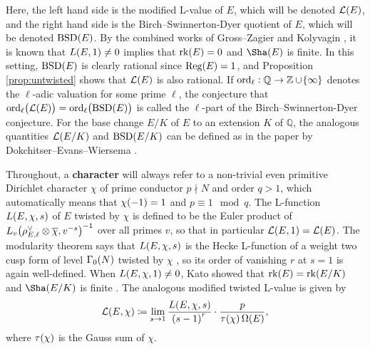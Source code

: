 \documentclass{article}
\theoremstyle{plain}
\theoremstyle{definition}
\newcommand{\BSD}{\operatorname{BSD}}
\newcommand{\LLL}{\mathcal{L}}
\newcommand{\ord}{\operatorname{ord}}
\newcommand{\QQ}{\mathbb{Q}}
\newcommand{\Reg}{\operatorname{Reg}}
\newcommand{\rk}{\operatorname{rk}}
\newcommand{\ZZ}{\mathbb{Z}}
\newcommand{\br}{\!\del}
\begin{document}
Here, the left hand side is the modified L-value of $ E $, which will be denoted $ \LLL\br{E} $, and the right hand side is the Birch--Swinnerton-Dyer quotient of $ E $, which will be denoted $ \BSD\br{E} $. By the combined works of Gross--Zagier \cite[Theorem 7.3]{GZ86} and Kolyvagin \cite[Corollary 2]{Kol88}, it is known that $ L\br{E, 1} \ne 0 $ implies that $ \rk\br{E} = 0 $ and $ \Sha\br{E} $ is finite. In this setting, $ \BSD\br{E} $ is clearly rational since $ \Reg\br{E} = 1 $, and Proposition \ref{prop:untwisted} shows that $ \LLL\br{E} $ is also rational. If $ \ord_\ell : \QQ \to \ZZ \cup \cbr{\infty} $ denotes the $ \ell $-adic valuation for some prime $ \ell $, the conjecture that $ \ord_\ell\br{\LLL\br{E}} = \ord_\ell\br{\BSD\br{E}} $ is called the $ \ell $-part of the Birch--Swinnerton-Dyer conjecture. For the base change $ E / K $ of $ E $ to an extension $ K $ of $ \QQ $, the analogous quantities $ \LLL\br[0]{E / K} $ and $ \BSD\br[0]{E / K} $ can be defined as in the paper by Dokchitser--Evans--Wiersema \cite[Section 1.5]{DEW21}.

Throughout, a \textbf{character} will always refer to a non-trivial even primitive Dirichlet character $ \chi $ of prime conductor $ p \nmid N $ and order $ q > 1 $, which automatically means that $ \chi\br{-1} = 1 $ and $ p \equiv 1 \mod q $. The L-function $ L\br{E, \chi, s} $ of $ E $ twisted by $ \chi $ is defined to be the Euler product of $ L_v\br[1]{\rho_{E, \ell}^\vee \otimes \overline{\chi}, v^{-s}}^{-1} $ over all primes $ v $, so that in particular $ \LLL\br{E, 1} = \LLL\br{E} $. The modularity theorem says that $ L\br{E, \chi, s} $ is the Hecke L-function of a weight two cusp form of level $ \Gamma_0\br{N} $ twisted by $ \chi $ \cite[Theorem 3.66]{Shi71}, so its order of vanishing $ r $ at $ s = 1 $ is again well-defined. When $ L\br{E, \chi, 1} \ne 0 $, Kato showed that $ \rk\br{E} = \rk\br[0]{E / K} $ and $ \Sha\br[0]{E / K} $ is finite \cite[Corollary 14.3]{Ka04}. The analogous modified twisted L-value is given by
$$ \LLL\br{E, \chi} \coloneqq \lim_{s \to 1} \dfrac{L\br{E, \chi, s}}{\br{s - 1}^r} \cdot \dfrac{p}{\tau\br{\chi}\Omega\br{E}}, $$
where $ \tau\br{\chi} $ is the Gauss sum of $ \chi $.
\end{document}
